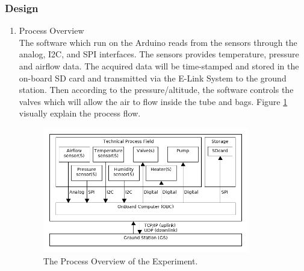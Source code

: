 \documentclass[a4paper,12pt,twoside]{article}
\begin{document}
\subsubsection{Design} \label{sec:4.8.2}
\begin{enumerate}[label=(\alph*)]
\item{Process Overview}\\
The software which run on the Arduino reads from the sensors through the analog, I2C, and SPI interfaces. The sensors provides temperature, pressure and airflow data. The acquired data will be time-stamped and stored in the on-board SD card and transmitted via the E-Link System to the ground station. Then according to the pressure/altitude, the software controls the valves which will allow the air to flow inside the tube and bags. Figure \ref{processOverview} visually explain the process flow.

\begin{figure}[H]
    \centering
    \includegraphics[width=0.85\textwidth]{4-experiment-design/img/Process-overview-V0-2.png}
    \caption{The Process Overview of the Experiment.}
    \label{processOverview}
\end{figure}


\end{enumerate}
\end{document}
